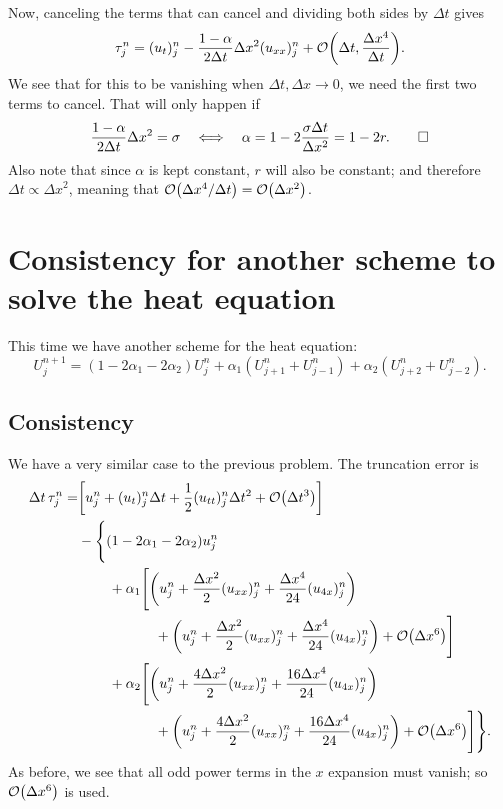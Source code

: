\documentclass[11pt,letter, swedish, english
]{article}
\newcommand{\Dx}{\ensuremath{\Delta{x}}}
\newcommand{\Dt}{\ensuremath{\Delta{t}}}
\begin{document}
Now, canceling the terms that can cancel and dividing both sides by
$\Dt$ gives
\begin{equation}
\tau_j^n=(u_t)_j^n-\frac{1-\alpha}{2\Dt}\Dx^2(u_{xx})_j^n
+\order{\Dt, \frac{\Dx^4}{\Dt}}.
\end{equation}
We see that for this to be vanishing when $\Dt, \Dx\to0$, we need the
first two terms to cancel. That will only happen if
\begin{equation}
\frac{1-\alpha}{2\Dt}\Dx^2=\sigma
\quad\Longleftrightarrow\quad
\alpha=1-2\frac{\sigma\Dt}{\Dx^2}=1-2r.
\qed
\end{equation}
Also note that since $\alpha$ is kept constant, $r$ will also be
constant; and therefore $\Dt\propto\Dx^2$, meaning that
$\order{\Dx^4/\Dt}=\order{\Dx^2}$.

\section{Consistency for another scheme to solve the heat equation}
This time we have another scheme for the heat equation:
\begin{equation}
U_{j}^{n+1}=(1-2\alpha_1-2\alpha_2)U_{j}^{n}
+\alpha_1(U_{j+1}^n+U_{j-1}^n)+\alpha_2(U_{j+2}^n+U_{j-2}^n).
\end{equation}

\subsection{Consistency}
We have a very similar case to the previous problem. The truncation
error is
\begin{equation}
\begin{aligned}
\Dt\,\tau_j^n=& \qty[u_j^n+(u_t)_j^n\Dt+\frac{1}{2}(u_{tt})_j^n\Dt^2+\order{\Dt^3}]\\
&-\Bigg\{(1-2\alpha_1-2\alpha_2)u_j^n
\\ &\hspace{22pt}+\alpha_1\Bigg[
\qty(u_j^n+\frac{\Dx^2}{2}(u_{xx})_j^n+\frac{\Dx^4}{24}(u_{4x})_j^n)
\\ &\hspace{55pt}
+\qty(u_j^n+\frac{\Dx^2}{2}(u_{xx})_j^n+\frac{\Dx^4}{24}(u_{4x})_j^n)
+\order{\Dx^6}\Bigg]
\\ &\hspace{22pt}
+\alpha_2\Bigg[
\qty(u_j^n+\frac{4\Dx^2}{2}(u_{xx})_j^n+\frac{16\Dx^4}{24}(u_{4x})_j^n)
\\ &\hspace{55pt}
+\qty(u_j^n+\frac{4\Dx^2}{2}(u_{xx})_j^n+\frac{16\Dx^4}{24}(u_{4x})_j^n)
+\order{\Dx^6}\Bigg]
\Bigg\}.
\end{aligned}
\end{equation}
As before, we see that all odd power terms in the $x$ expansion must
vanish; so $\order{\Dx^6}$ is used. 
\end{document}
